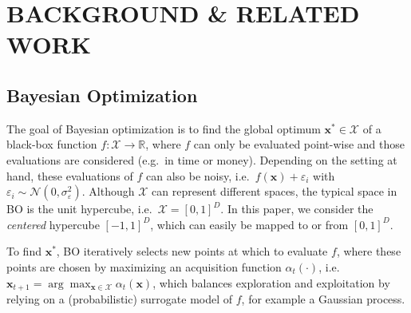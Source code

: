 \documentclass[twoside]{article}
\theoremstyle{plain}
\theoremstyle{definition}
\begin{document}
\section{\bfseries\small BACKGROUND \& RELATED WORK}

\subsection{Bayesian Optimization} \label{sec:BO}
The goal of Bayesian optimization \citep{garnett2023bayesian} is to find the global optimum $\mathbf{x}^* \in \mathcal{X}$ of a black-box function $f: \mathcal{X} \rightarrow \mathbb{R}$, where $f$ can only be evaluated point-wise and those evaluations are considered  (e.g.\ in time or money). Depending on the setting at hand, these evaluations of $f$ can also be noisy, i.e.\ $f(\mathbf{x}) + \varepsilon_i$ with $\varepsilon_i \sim \mathcal{N}\left(0, \sigma^2_{\varepsilon}\right)$. Although $\mathcal{X}$ can represent different spaces, the typical space in BO is the unit hypercube, i.e.\ $\mathcal{X} = [0,1]^D$. In this paper, we consider the \emph{centered} hypercube $[-1, 1]^D$, which can easily be mapped to or from $[0,1]^D$.

To find $\mathbf{x^*}$, BO iteratively selects new points at which to evaluate $f$, where these points are chosen by maximizing an acquisition function $\alpha_t(\cdot)$, i.e.\ $\mathbf{x}_{t+1} = \arg \max_{\mathbf{x} \in \mathcal{X}} \alpha_t(\mathbf{x})$, which balances exploration and exploitation by relying on a (probabilistic) surrogate model of $f$, for example a Gaussian process.
\end{document}
